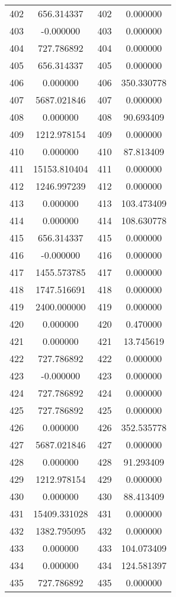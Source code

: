 \documentclass[12pt]{article}
\begin{document}
\begin{longtable}{@{}cccc@{}}
402 & 656.314337 & 402 & 0.000000 \\
403 & -0.000000 & 403 & 0.000000 \\
404 & 727.786892 & 404 & 0.000000 \\
405 & 656.314337 & 405 & 0.000000 \\
406 & 0.000000 & 406 & 350.330778 \\
407 & 5687.021846 & 407 & 0.000000 \\
408 & 0.000000 & 408 & 90.693409 \\
409 & 1212.978154 & 409 & 0.000000 \\
410 & 0.000000 & 410 & 87.813409 \\
411 & 15153.810404 & 411 & 0.000000 \\
412 & 1246.997239 & 412 & 0.000000 \\
413 & 0.000000 & 413 & 103.473409 \\
414 & 0.000000 & 414 & 108.630778 \\
415 & 656.314337 & 415 & 0.000000 \\
416 & -0.000000 & 416 & 0.000000 \\
417 & 1455.573785 & 417 & 0.000000 \\
418 & 1747.516691 & 418 & 0.000000 \\
419 & 2400.000000 & 419 & 0.000000 \\
420 & 0.000000 & 420 & 0.470000 \\
421 & 0.000000 & 421 & 13.745619 \\
422 & 727.786892 & 422 & 0.000000 \\
423 & -0.000000 & 423 & 0.000000 \\
424 & 727.786892 & 424 & 0.000000 \\
425 & 727.786892 & 425 & 0.000000 \\
426 & 0.000000 & 426 & 352.535778 \\
427 & 5687.021846 & 427 & 0.000000 \\
428 & 0.000000 & 428 & 91.293409 \\
429 & 1212.978154 & 429 & 0.000000 \\
430 & 0.000000 & 430 & 88.413409 \\
431 & 15409.331028 & 431 & 0.000000 \\
432 & 1382.795095 & 432 & 0.000000 \\
433 & 0.000000 & 433 & 104.073409 \\
434 & 0.000000 & 434 & 124.581397 \\
435 & 727.786892 & 435 & 0.000000 \\

\end{longtable}
\end{document}
